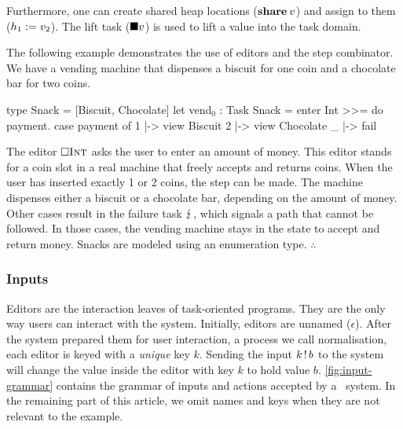 Furthermore, one can create shared heap locations ($\textbf{share}\: v$) and assign to them ($h_1 := v_2$).
The lift task ($\blacksquare v$) is used to lift a value into the task domain.

\begin{example}
  \label{exm:vending-base}
  The following example demonstrates the use of editors and the step combinator.
  We have a vending machine that dispenses a biscuit for one coin and a chocolate bar for two coins.
  \begin{TASK}[emph={payment}]
    type Snack = [Biscuit, Chocolate]
    let vend$_0$ : Task Snack = enter Int >>= do payment.
      case payment of
        1 |-> view Biscuit
        2 |-> view Chocolate
        _ |-> fail
  \end{TASK}
  The editor $\square {\text{\normalfont\sffamily\scshape Int}}$ asks the user to enter an amount of money.
  This editor stands for a coin slot in a real machine that freely accepts and returns coins.
  When the user has inserted exactly 1 or 2 coins, the step can be made.
  The machine dispenses either a biscuit or a chocolate bar, depending on the amount of money.
  Other cases result in the failure task $\lightning$, which signals a path that cannot be followed.
  In those cases, the vending machine stays in the state to accept and return money.
  Snacks are modeled using an enumeration type.
\hfill$\therefore$\end{example}


\subsubsection{Inputs}
\label{sub:inputs}

Editors are the interaction leaves of task-oriented programs.
They are the only way users can interact with the system.
Initially, editors are unnamed ($\epsilon$).
After the system prepared them for user interaction, a process we call normalisation,
each editor is keyed with a \emph{unique} key $k$.
Sending the input $k\,!\,b$ to the system will change the value inside the editor with key $k$ to hold value $b$.
\cref{fig:input-grammar} contains the grammar of inputs and actions accepted by a \TOPHAT\ system.
In the remaining part of this article,
we omit names and keys when they are not relevant to the example.

